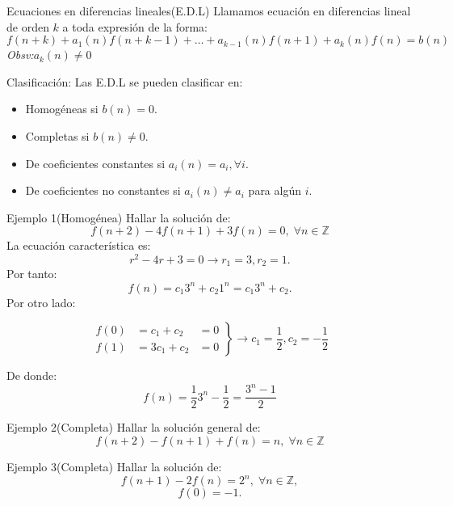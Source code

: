 \documentclass[spanish, utf8,handout]{beamer} %
\theoremstyle{definition}
\begin{document}
\begin{frame}
	 \begin{block}{Ecuaciones en diferencias lineales(E.D.L)}
	 Llamamos ecuación en diferencias lineal de orden $ k $ a toda expresión de la forma:
	 $$
	 f(n+k)+a_{1}(n)f(n+k-1)+\ldots+a_{k-1}(n)f(n+1)+a_{k}(n)f(n)=b(n)
	 $$
	 \emph{Obsv:}\hspace{2mm}$ a_{k}(n)\neq0$
	 \end{block}
 \begin{block}{Clasificación:}
 	Las E.D.L se pueden clasificar en:\\
 	\begin{itemize}
 		\item Homogéneas si $ b(n)=0 .$
 		\item Completas si $ b(n)\neq0.$
 		\item De coeficientes constantes si $ a_{i}(n)=a_{i}, \forall i .$
 		\item De coeficientes no constantes si $ a_{i}(n)\neq a_{i} $ para algún $ i .$
 	\end{itemize}
 \end{block}
\end{frame}
\begin{frame}

	\begin{block}{Ejemplo 1(Homogénea)}
		Hallar la solución de:
		$$
		f(n+2)-4f(n+1)+3f(n)=0, \; \forall n \in \mathbb{Z}
		$$
		La ecuación característica es:
		$$
		r^{2}-4r+3=0 \rightarrow r_{1}=3,r_{2}=1.
		$$
		Por tanto:
		$$
		f(n)=c_{1}3^{n}+c_{2}1^{n}=c_{1}3^{n}+c_{2}.
		$$
		Por otro lado:
				
		\begin{equation*}
		\left.\begin{aligned}
		f(0)&=c_{1}+c_{2}&=0\\
		f(1)&=3c_{1}+c_{2}&=0
		\end{aligned}
		\right\}
		\rightarrow c_{1}=\frac{1}{2}, c_{2}=-\frac{1}{2}
		\end{equation*}
		
		De donde:
		$$
		f(n)=\frac{1}{2}3^{n}-\frac{1}{2}=\frac{3^{n}-1}{2}
		$$
	\end{block}
\end{frame}
	\begin{frame}
	\begin{block}{Ejemplo 2(Completa)}
		Hallar la solución general de:
		$$
		f(n+2)-f(n+1)+f(n)=n, \; \forall n \in \mathbb{Z}
		$$
	\end{block}
\begin{block}{Ejemplo 3(Completa)}
	Hallar la solución de:
	$$
	f(n+1)-2f(n)=2^{n}, \; \forall n \in \mathbb{Z},
	$$
	$$
	f(0)=-1.
	$$
\end{block}
	\end{frame}
\end{document}
